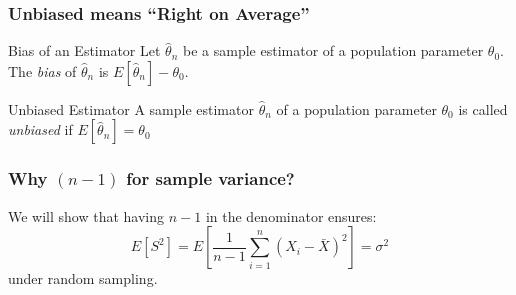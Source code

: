 
\begin{frame}
\frametitle{Unbiased means ``Right on Average''}

\begin{block}{Bias of an Estimator}
Let $\widehat{\theta}_n$ be a sample estimator of a population parameter $\theta_0$. The \emph{bias} of $\widehat{\theta}_n$ is $E[\widehat{\theta}_n] - \theta_0$.
\end{block}

\begin{block}{Unbiased Estimator}
A sample estimator $\widehat{\theta}_n$ of a population parameter $\theta_0$ is called \emph{unbiased} if $E[\widehat{\theta}_n]= \theta_0$
\end{block}

\end{frame}



\begin{frame}
\frametitle{Why $(n-1)$ for sample variance?}
\alert{We will show that having $n-1$ in the denominator ensures:}
$$E[S^2] =E\left[ \frac{1}{n-1} \sum_{i=1}^n \left(X_i - \bar{X}\right)^2\right] = \sigma^2$$
\alert{under random sampling.}
\end{frame}




